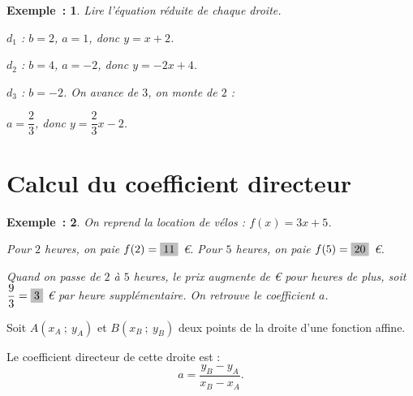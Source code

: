 \documentclass[12pt]{article}
\theoremstyle{break}
\newtheorem*{example}{Exemple~:}
\theoremstyle{inline}
\begin{document}
\begin{example}
  \begin{minipage}[t]{0.45\linewidth}
    \vspace{0pt}
    \centering
  \end{minipage}
  \hfill
  \begin{minipage}[t]{0.5\linewidth}
    \vspace{1em}
    Lire l'équation réduite de chaque droite.

    \medskip
    \begin{multihideW}[1.5em]
      $d_1$ : $b = 2$, $a = 1$, donc $y = x + 2$.

      \bigskip
      $d_2$ : $b = 4$, $a = -2$, donc $y = -2x + 4$.

      \bigskip
      $d_3$ : $b = -2$. On avance de $3$, on monte de $2$ :

      \smallskip
      $a = \dfrac{2}{3}$, donc $y = \dfrac{2}{3}x - 2$.
    \end{multihideW}
  \end{minipage}
\end{example}

\section{Calcul du coefficient directeur}

\begin{example}
  On reprend la location de vélos : $f(x) = 3x + 5$.

  Pour $2$ heures, on paie $f(2) = \hideM{11}$ €. Pour $5$ heures, on paie $f(5) = \hideM{20}$ €.

  Quand on passe de $2$ à $5$ heures, le prix augmente de  € pour  heures de plus,
  soit $\dfrac{9}{3} = \hideM{3}$ € par heure supplémentaire. On retrouve le coefficient $a$.
\end{example}

\begin{proposition}{}{}
  \begin{multihide}
    Soit $A(x_A~;~y_A)$ et $B(x_B~;~y_B)$ deux points de la droite d'une fonction affine.

    Le coefficient directeur de cette droite est :
    \[
      a = \frac{y_B - y_A}{x_B - x_A}.
    \]
  \end{multihide}
\end{proposition}
\end{document}
